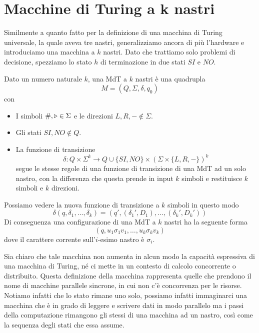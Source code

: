 \section{Macchine di Turing a k nastri}

Similmente a quanto fatto per la definizione di una macchina di
Turing universale, la quale aveva tre nastri, generalizziamo
ancora di più l'hardware e introduciamo una macchina a $k$
nastri. Dato che trattiamo solo problemi di decisione, spezziamo
lo stato $h$ di terminazione in due stati $SI$ e $NO$.

\begin{definition} \label{def: mdt a k nastri}
	Dato un numero naturale $k$, una MdT a $k$ nastri è una
	quadrupla
	\[ M = (Q, \Sigma, \delta, q_0) \]
	con
	\begin{itemize}
		\item I simboli $\#, \triangleright \in \Sigma$ e le direzioni
		      $L, R, - \notin \Sigma$.
		\item Gli stati $SI, NO \notin Q$.
		\item La funzione di transizione
		      \[
			      \delta : Q \times \Sigma^k \to
			      Q \cup \{ SI, NO \} \times
			      (\Sigma \times \{ L, R, - \})^k
		      \]
		      segue le stesse regole di una funzione di
		      transizione di una MdT ad un solo nastro, con
		      la differenza che questa prende in input $k$
		      simboli e restituisce $k$ simboli e $k$ direzioni.
	\end{itemize}
\end{definition}

Possiamo vedere la nuova funzione di transizione a $k$ simboli
in questo modo
\[
	\delta (q, \delta_1, \dots, \delta_k) =
	(q', (\delta_1', D_1), \dots, (\delta_k', D_k'))
\]
Di conseguenza una configurazione di una MdT a $k$ nastri ha la
seguente forma
\[ (q, u_1 \sigma_1 v_1, \dots, u_k \sigma_k v_k) \]
dove il carattere corrente sull'$i$-esimo nastro è $\sigma_i$.

Sia chiaro che tale macchina non aumenta in alcun modo la
capacità espressiva di una macchina di Turing, né ci mette in
un contesto di calcolo concorrente o distribuito. Questa
definizione della macchina rappresenta quelle che prendono il
nome di macchine parallele sincrone, in cui non c'è concorrenza
per le risorse. Notiamo infatti che lo stato rimane uno solo,
possiamo infatti immaginarci una macchina che è in grado di
leggere e scrivere dati in modo parallelo ma i passi della
computazione rimangono gli stessi di una macchina ad un nastro,
così come la sequenza degli stati che essa assume.
